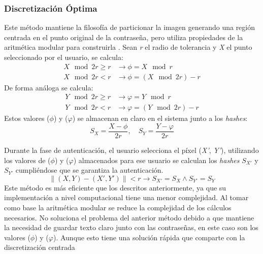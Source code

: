 \subsubsection{Discretización Óptima}
	
Este método mantiene la filosofía de particionar la imagen generando una región centrada en el punto original de la contraseña, pero utiliza propiedades de la aritmética modular para construirla \cite{bicakci2008optimal}. Sean \textit{r} el radio de tolerancia y \textit{X} el punto seleccionado por el usuario, se calcula:
\begin{equation}
	\begin{aligned}
		\textit{X} \mod{2r} \geq r &\rightarrow \phi = X \mod{r} \\
		\textit{X} \mod{2r} < r &\rightarrow \phi = (X \mod{2r}) - r
	\end{aligned}
	\label{eq:phi}
\end{equation}
De forma análoga se calcula:
\begin{equation}
	\begin{aligned}
		\textit{Y} \mod{2r} \geq r &\rightarrow \varphi = Y \mod{r} \\
		\textit{Y} \mod{2r} < r &\rightarrow \varphi = (Y \mod{2r}) - r
	\end{aligned}
	\label{eq:varphi}
\end{equation}
Estos valores (\(\phi\)) y (\(\varphi\)) se almacenan en claro en el sistema junto a los \textit{hashes}:
\begin{equation}
	S_X = \frac{X - \phi}{2r}, \quad S_Y = \frac{Y - \varphi}{2r} \label{eq:hashes}
\end{equation}

Durante la fase de autenticación, el usuario selecciona el píxel (\textit{X'}, \textit{Y'}), utilizando los valores de (\(\phi\)) y (\(\varphi\)) almacenados para ese usuario se calculan los \textit{hashes} \(S_{X'}\) y \(S_{Y'}\) cumpliéndose que se garantiza la autenticación.
\begin{equation}
	\|(X, Y) - (X', Y')\| < r \rightarrow S_{X'} = S_X \land S_{Y'} = S_Y \label{eq:autenticacion}
\end{equation}
Este método es más eficiente que los descritos anteriormente, ya que su implementación a nivel computacional tiene una menor complejidad. Al tomar como base la aritmética modular se reduce la complejidad de los cálculos necesarios. No soluciona el problema del anterior método debido a que mantiene la necesidad de guardar texto claro junto con  las  contraseñas,  en  este  caso  son  los  valores   ($\phi$)  y  ($\varphi$).  Aunque  esto tiene  una  solución  rápida  que comparte con la discretización centrada


